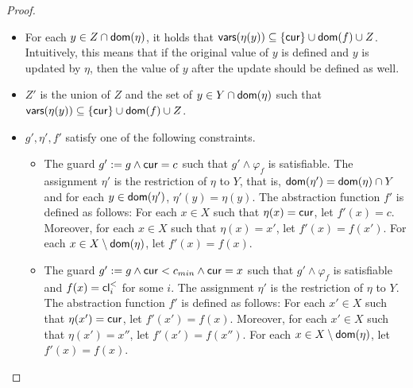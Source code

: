 \begin{appendix}
{\begin{proof}
\begin{itemize}
\item  For each $y \in Z \cap \mathsf{dom}(\eta)$, it holds that $\mathsf{vars}(\eta(y)) \subseteq \{\mathsf{cur}\} \cup  \mathsf{dom}(f) \cup Z$.  Intuitively, this means that if the original value of $y$ is defined and $y$ is updated by $\eta$, then the value of $y$ after the update should be defined as well.

\item $Z'$ is the union of $Z$ and the set of $y \in Y \cap \mathsf{dom}(\eta)$ such that $\mathsf{vars}(\eta(y)) \subseteq \{\mathsf{cur}\} \cup  \mathsf{dom}(f) \cup Z$.

\item $g',\eta', f'$ satisfy one of the following constraints.
\begin{itemize}
\item The guard $g' := g \wedge \mathsf{cur} = c$ such that $g' \wedge \varphi_f$ is satisfiable. The assignment $\eta'$ is the restriction of  $\eta$ to $Y$, that is, $\mathsf{dom}(\eta') = \mathsf{dom}(\eta) \cap Y$ and for each $y \in \mathsf{dom}(\eta')$, $\eta'(y)=\eta(y)$. The abstraction function $f'$ is defined as follows: For each $x \in X$ such that $\eta(x)=\mathsf{cur}$,  let $f'(x) = c$. Moreover, for each $x \in X$ such that $\eta(x) = x'$, let $f'(x)=f(x')$. For each $x \in X \setminus \mathsf{dom}(\eta)$, let $f'(x)=f(x)$.
 
\item The guard $g' := g \wedge \mathsf{cur} < c_{min} \wedge \mathsf{cur} = x$ such that $g' \wedge \varphi_f$ is satisfiable and $f(x)=\mathsf{cl}^{<}_i$ for some $i$.  The assignment $\eta'$ is the restriction of  $\eta$ to $Y$. The abstraction function $f'$ is defined as follows: For each $x' \in X$ such that $\eta(x')=\mathsf{cur}$, let $f'(x')=f(x)$. Moreover, for each $x' \in X$ such that $\eta(x')=x''$, let $f'(x')=f(x'')$. For each $x \in X \setminus \mathsf{dom}(\eta)$, let $f'(x)=f(x)$.


\end{itemize}
\end{itemize}
\end{proof}}
\end{appendix}
